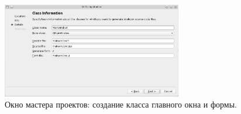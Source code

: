 \begin{figure}[htb]
\begin{center}
\includegraphics[width=0.7\textwidth]{img/ris_15_1}
\caption[Окно мастера проектов: создание класса главного окна и формы.]{Окно мастера проектов: создание класса
главного окна и формы.}
\label{ch14:refDrawing0}
\end{center}
\end{figure}

